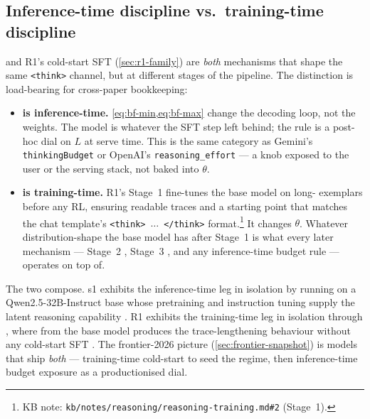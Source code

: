 \subsection{Inference-time discipline vs.\ training-time discipline}
\label{sec:bf-vs-cold-start}

 and R1's cold-start SFT (\cref{sec:r1-family}) are
\emph{both} mechanisms that shape the same \texttt{<think>} channel,
but at different stages of the pipeline. The distinction is
load-bearing for cross-paper bookkeeping:

\begin{itemize}
  \item \textbf{ is inference-time.}
        \cref{eq:bf-min,eq:bf-max} change the decoding loop, not the
        weights. The model is whatever the SFT step left behind; the
        rule is a post-hoc dial on $L$ at serve time. This is the same
        category as Gemini's \texttt{thinkingBudget} or OpenAI's
        \texttt{reasoning\_effort} --- a knob exposed to the user or
        the serving stack, not baked into $\theta$.

  \item \textbf{ is training-time.} R1's Stage~1
        \citep[\S 2.3]{deepseek-r1} fine-tunes the base model on
        long- exemplars before any RL, ensuring readable traces and
        a starting point that matches the chat template's
        \texttt{<think>}~$\ldots$~\texttt{</think>}
        format.\footnote{KB note:
        \texttt{kb/notes/reasoning/reasoning-training.md\#2} (Stage~1).}
        It changes $\theta$. Whatever distribution-shape the base
        model has after Stage~1 is what every later mechanism ---
        Stage~2 , Stage~3 , and any
        inference-time budget rule --- operates on top of.
\end{itemize}

The two compose. s1 exhibits the inference-time leg in isolation by
running on a Qwen2.5-32B-Instruct base whose pretraining and
instruction tuning supply the latent reasoning capability
\citep[\S 5.1]{s1-2025}. R1 exhibits the training-time leg in
isolation through , where  from the base model produces the
trace-lengthening behaviour without any cold-start SFT
\citep[\S 2.2.4]{deepseek-r1}. The frontier-2026 picture
(\cref{sec:frontier-snapshot}) is models that ship \emph{both} ---
training-time cold-start to seed the regime, then inference-time
budget exposure as a productionised dial.


